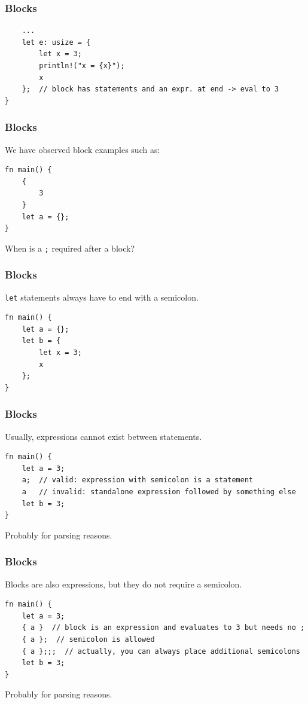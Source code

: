 \documentclass[aspectratio=169]{beamer}
\begin{document}
\begin{frame}[fragile]
    \frametitle{Blocks}
    \begin{verbatim}
    ...
    let e: usize = {
        let x = 3;
        println!("x = {x}");
        x
    };  // block has statements and an expr. at end -> eval to 3
}
    \end{verbatim}
\end{frame}

\begin{frame}[fragile]
    \frametitle{Blocks}
    We have observed block examples such as:
    \begin{verbatim}
fn main() {
    {
        3
    }
    let a = {};
}
    \end{verbatim}
    \pause
    When is a \texttt{;} required after a block?
\end{frame}

\begin{frame}[fragile]
    \frametitle{Blocks}
    \texttt{let} statements always have to end with a semicolon.
    \begin{verbatim}
fn main() {
    let a = {};
    let b = {
        let x = 3;
        x
    };
}
    \end{verbatim}
\end{frame}

\begin{frame}[fragile]
    \frametitle{Blocks}
    Usually, expressions cannot exist between statements.
    \pause
    \begin{verbatim}
fn main() {
    let a = 3;
    a;  // valid: expression with semicolon is a statement
    a   // invalid: standalone expression followed by something else
    let b = 3;
}
    \end{verbatim}
    \pause
    Probably for parsing reasons.
\end{frame}

\begin{frame}[fragile]
    \frametitle{Blocks}
    Blocks are also expressions, but they do not require a semicolon.
    \pause
    \begin{verbatim}
fn main() {
    let a = 3;
    { a }  // block is an expression and evaluates to 3 but needs no ;
    { a };  // semicolon is allowed
    { a };;;  // actually, you can always place additional semicolons
    let b = 3;
}
    \end{verbatim}
    \pause
    Probably for parsing reasons.
\end{frame}
\end{document}
